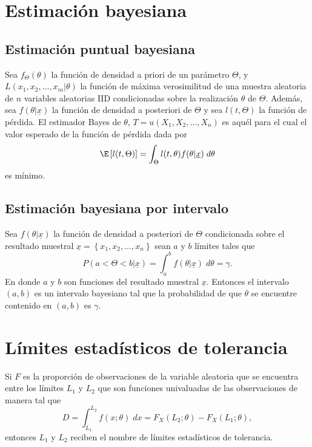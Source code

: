 \section{Estimación bayesiana}

\subsection{Estimación puntual bayesiana}

\begin{def.}
    Sea $f_{\Theta}(\theta)$ la función de densidad a priori de un parámetro $\Theta$, y $L(x_1,x_2,\ldots,x_m | \theta)$ la función de máxima verosimilitud de una muestra aleatoria de $n$ variables aleatorias IID condicionadas sobre la realización $\theta$ de $\Theta$. Además, sea $f(\theta|\underline{x})$ la función de densidad a posteriori de $\Theta$ y sea $l(t,\Theta)$ la función de pérdida. El estimador Bayes de $\theta$, $T=u(X_1,X_2,\ldots,X_n)$ es aquél para el cual el valor esperado de la función de pérdida dada por
    $$\E\left[l(t,\Theta)\right]=\int_{\Theta}l(t,\theta)f(\theta|\underline{x})\; d\theta$$
    es mínimo.
\end{def.}

\subsection{Estimación bayesiana por intervalo}

\begin{def.}
    Sea $f(\theta | \underline{x})$ la función de densidad a posteriori de $\Theta$ condicionada sobre el resultado muestral $\underline{x}=\left\{x_1,x_2,\ldots,x_n\right\}$ sean $a$ y $b$ límites tales que 
    $$P(a<\Theta<b | \underline{x})=\int_a^b f(\theta | \underline{x})\; d\theta=\gamma.$$
    En donde $a$ y $b$ son funciones del resultado muestral $\underline{x}.$ Entonces el intervalo $(a,b)$ es un intervalo bayesiano tal que la probabilidad de que $\theta$ se encuentre contenido en $(a,b)$ es $\gamma$.
\end{def.}

\section{Límites estadísticos de tolerancia}

\begin{def.}
    Si $F$ es la proporción de observaciones de la variable aleatoria que se encuentra entre los límites $L_1$ y $L_2$ que son funciones univaluadas de las observaciones de manera tal que
    $$D=\int_{L_1}^{L_2}f(x;\theta)\; dx = F_X(L_2;\theta)-F_X(L_1;\theta),$$
    entonces $L_1$ y $L_2$ reciben el nombre de límites estadísticos de tolerancia.
\end{def.}

